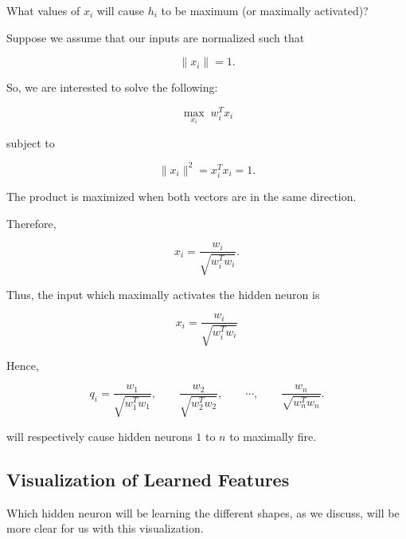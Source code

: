 \documentclass{article}
\begin{document}
What values of \(x_i\) will cause \(h_i\) to be maximum
(or maximally activated)?

Suppose we assume that our inputs are normalized such that

\[
\|x_i\|=1.
\]

So, we are interested to solve the following:

\[
\max_{x_i}\; w_i^T x_i
\]

subject to

\[
\|x_i\|^2=x_i^T x_i=1.
\]

The product is maximized when both vectors are in the same direction.

Therefore,

\[
x_i=
\frac{w_i}{\sqrt{w_i^T w_i}}.
\]

Thus, the input which maximally activates the hidden neuron is

\[
\boxed{
	x_i=
	\frac{w_i}{\sqrt{w_i^T w_i}}
}
\]

Hence,

\[
q_i=
\frac{w_1}{\sqrt{w_1^Tw_1}},
\qquad
\frac{w_2}{\sqrt{w_2^Tw_2}},
\qquad
\cdots,
\qquad
\frac{w_n}{\sqrt{w_n^Tw_n}}.
\]

will respectively cause hidden neurons \(1\) to \(n\) to maximally
fire.



\subsection{Visualization of Learned Features}

Which hidden neuron will be learning the different shapes, as we
discuss, will be more clear for us with this visualization.
\end{document}
